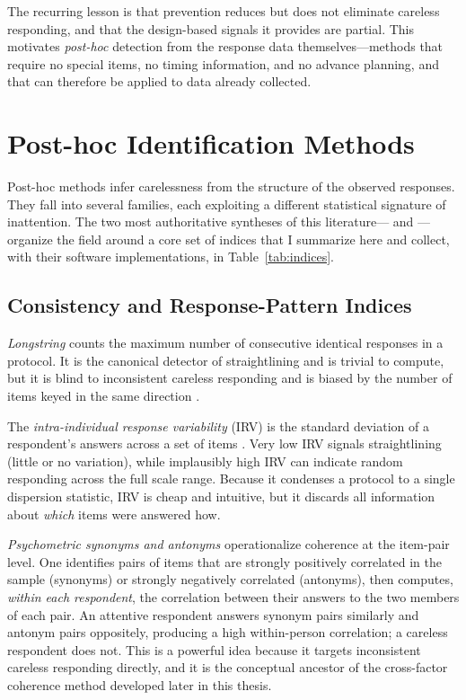 \documentclass[doc,11pt,donotrepeattitle]{apa7}
\begin{document}
The recurring lesson is that prevention reduces but does not eliminate careless
responding, and that the design-based signals it provides are partial. This
motivates \emph{post-hoc} detection from the response data themselves---methods
that require no special items, no timing information, and no advance planning,
and that can therefore be applied to data already collected.

\section{Post-hoc Identification Methods}

Post-hoc methods infer carelessness from the structure of the observed
responses. They fall into several families, each exploiting a different
statistical signature of inattention. The two most authoritative syntheses of
this literature---\textcite{meade2012identifying} and \textcite{curran2016methods}---organize
the field around a core set of indices that I summarize here and collect, with
their software implementations, in Table~\ref{tab:indices}.

\subsection{Consistency and Response-Pattern Indices}

\emph{Longstring} counts the maximum number of consecutive identical responses
in a protocol. It is the canonical detector of straightlining and is trivial to
compute, but it is blind to inconsistent careless responding and is biased by
the number of items keyed in the same direction \parencite{johnson2005ascertaining,
meade2012identifying}.

The \emph{intra-individual response variability} (IRV) is the standard deviation
of a respondent's answers across a set of items \parencite{dunn2018intra}. Very
low IRV signals straightlining (little or no variation), while implausibly high
IRV can indicate random responding across the full scale range. Because it
condenses a protocol to a single dispersion statistic, IRV is cheap and
intuitive, but it discards all information about \emph{which} items were answered
how.

\emph{Psychometric synonyms and antonyms} \parencite{meade2012identifying}
operationalize coherence at the item-pair level. One identifies pairs of items
that are strongly positively correlated in the sample (synonyms) or strongly
negatively correlated (antonyms), then computes, \emph{within each respondent},
the correlation between their answers to the two members of each pair. An
attentive respondent answers synonym pairs similarly and antonym pairs
oppositely, producing a high within-person correlation; a careless respondent
does not. This is a powerful idea because it targets inconsistent careless
responding directly, and it is the conceptual ancestor of the cross-factor
coherence method developed later in this thesis.
\end{document}

